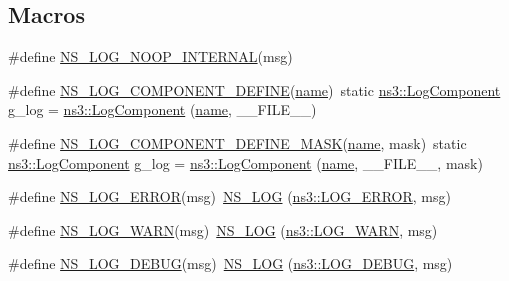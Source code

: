 \subsection*{Macros}
\begin{DoxyCompactItemize}
\item 
\#define \hyperlink{group__logging_ga426ea8a6e4e51015f546cccb5eeebfa1}{N\+S\+\_\+\+L\+O\+G\+\_\+\+N\+O\+O\+P\+\_\+\+I\+N\+T\+E\+R\+N\+AL}(msg)
\item 
\#define \hyperlink{group__logging_ga225a95395fa117b7309aa3c43518d02e}{N\+S\+\_\+\+L\+O\+G\+\_\+\+C\+O\+M\+P\+O\+N\+E\+N\+T\+\_\+\+D\+E\+F\+I\+NE}(\hyperlink{generate__test__data__lte__spectrum__model_8m_ab74e6bf80237ddc4109968cedc58c151}{name})~static \hyperlink{classns3_1_1LogComponent}{ns3\+::\+Log\+Component} g\+\_\+log = \hyperlink{classns3_1_1LogComponent}{ns3\+::\+Log\+Component} (\hyperlink{generate__test__data__lte__spectrum__model_8m_ab74e6bf80237ddc4109968cedc58c151}{name}, \+\_\+\+\_\+\+F\+I\+L\+E\+\_\+\+\_\+)
\item 
\#define \hyperlink{group__logging_ga28e5e16de17cfc6ded3e30a68ef044e2}{N\+S\+\_\+\+L\+O\+G\+\_\+\+C\+O\+M\+P\+O\+N\+E\+N\+T\+\_\+\+D\+E\+F\+I\+N\+E\+\_\+\+M\+A\+SK}(\hyperlink{generate__test__data__lte__spectrum__model_8m_ab74e6bf80237ddc4109968cedc58c151}{name},  mask)~static \hyperlink{classns3_1_1LogComponent}{ns3\+::\+Log\+Component} g\+\_\+log = \hyperlink{classns3_1_1LogComponent}{ns3\+::\+Log\+Component} (\hyperlink{generate__test__data__lte__spectrum__model_8m_ab74e6bf80237ddc4109968cedc58c151}{name}, \+\_\+\+\_\+\+F\+I\+L\+E\+\_\+\+\_\+, mask)
\item 
\#define \hyperlink{group__logging_ga0261a8db1d4ac5f79417d117634fd455}{N\+S\+\_\+\+L\+O\+G\+\_\+\+E\+R\+R\+OR}(msg)~\hyperlink{log-macros-disabled_8h_ab01b4392d98b06fb128e77c85129a477}{N\+S\+\_\+\+L\+OG} (\hyperlink{namespacens3_aa6464a4d69551a9cc968e17a65f39bdba4055b1591e6f4a44495a693a01c4f3e3}{ns3\+::\+L\+O\+G\+\_\+\+E\+R\+R\+OR}, msg)
\item 
\#define \hyperlink{group__logging_gade7208b4009cdf0e25783cd26766f559}{N\+S\+\_\+\+L\+O\+G\+\_\+\+W\+A\+RN}(msg)~\hyperlink{log-macros-disabled_8h_ab01b4392d98b06fb128e77c85129a477}{N\+S\+\_\+\+L\+OG} (\hyperlink{namespacens3_aa6464a4d69551a9cc968e17a65f39bdba490255e4623b1bbda847c0599f6f94e9}{ns3\+::\+L\+O\+G\+\_\+\+W\+A\+RN}, msg)
\item 
\#define \hyperlink{group__logging_ga413f1886406d49f59a6a0a89b77b4d0a}{N\+S\+\_\+\+L\+O\+G\+\_\+\+D\+E\+B\+UG}(msg)~\hyperlink{log-macros-disabled_8h_ab01b4392d98b06fb128e77c85129a477}{N\+S\+\_\+\+L\+OG} (\hyperlink{namespacens3_aa6464a4d69551a9cc968e17a65f39bdbae5a9fe44e2d62303656baa0cf1a687a0}{ns3\+::\+L\+O\+G\+\_\+\+D\+E\+B\+UG}, msg)

\end{DoxyCompactItemize}
